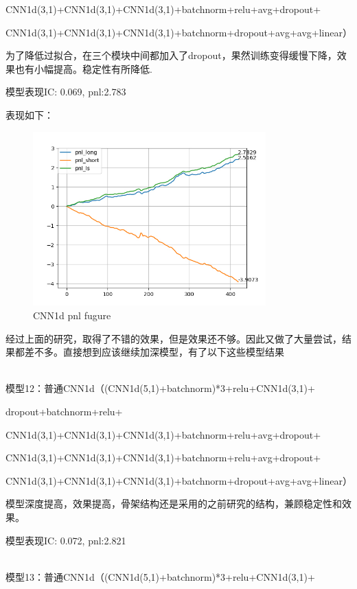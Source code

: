 \documentclass[11pt]{ctexart}
\begin{document}
CNN1d(3,1)+CNN1d(3,1)+CNN1d(3,1)+batchnorm+relu+avg+dropout+

CNN1d(3,1)+CNN1d(3,1)+CNN1d(3,1)+batchnorm+dropout+avg+avg+linear）

为了降低过拟合，在三个模块中间都加入了dropout，果然训练变得缓慢下降，效果也有小幅提高。稳定性有所降低.

模型表现{\kaishu \small IC: 0.069, pnl:2.783}

表现如下：
\begin{figure}[H]

\begin{center}
\includegraphics[width=0.8\textwidth]{2.PNG}
\end{center}
\caption{CNN1d pnl fugure}
\label{FIG.1}
\end{figure}

经过上面的研究，取得了不错的效果，但是效果还不够。因此又做了大量尝试，结果都差不多。直接想到应该继续加深模型，有了以下这些模型结果

~\\
模型12：普通CNN1d（(CNN1d(5,1)+batchnorm)*3+relu+CNN1d(3,1)+

dropout+batchnorm+relu+

CNN1d(3,1)+CNN1d(3,1)+CNN1d(3,1)+batchnorm+relu+avg+dropout+

CNN1d(3,1)+CNN1d(3,1)+CNN1d(3,1)+batchnorm+relu+avg+dropout+

CNN1d(3,1)+CNN1d(3,1)+CNN1d(3,1)+batchnorm+dropout+avg+avg+linear）

模型深度提高，效果提高，骨架结构还是采用的之前研究的结构，兼顾稳定性和效果。

模型表现{\kaishu \small IC: 0.072, pnl:2.821}

~\\
模型13：普通CNN1d（(CNN1d(5,1)+batchnorm)*3+relu+CNN1d(3,1)+
\end{document}
